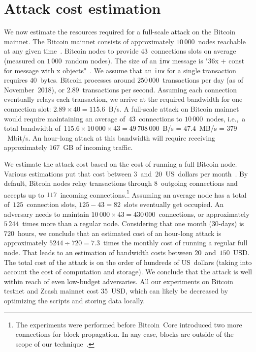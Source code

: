 \section{Attack cost estimation}

We now estimate the resources required for a full-scale attack on the Bitcoin mainnet.
The Bitcoin mainnet consists of approximately $10\,000$~nodes reachable at any given time~\cite{Bitnodes}.
Bitcoin nodes to provide $43$~connections slots on average (measured on $1\,000$~random nodes).
The size of an \texttt{inv} message is "36x + const for message with x objects"~\cite{BitcoinWiki}.
We assume that an \texttt{inv} for a single transaction requires $40$~bytes.
Bitcoin processes around $250\,000$~transactions per day (as of November~2018), or $2.89$~transactions per second.
Assuming each connection eventually relays each transaction, we arrive at the required bandwidth for one connection slot: $2.89 \times 40 = 115.6$~B/s.
A full-scale attack on Bitcoin mainnet would require maintaining an average of~$43$~connections to $10\,000$~nodes, i.e.,~a total bandwidth of~$115.6 \times 10\,000 \times 43 = 49\,708\,000$~B/s = $47.4$~MB/s = $379$~Mbit/s.
An hour-long attack at this bandwidth will require receiving approximately $167$~GB of incoming traffic.

We estimate the attack cost based on the cost of running a full Bitcoin node.
Various estimations put that cost between $3$~and~$20$~US~dollars per month~\cite{Zeyde2018, Connell2017}.
By default, Bitcoin nodes relay transactions through $8$~outgoing connections and accepts up to $117$~incoming connections.\footnote{The experiments were performed before Bitcoin~Core introduced two more connections for block propagation. In any case, blocks are outside of the scope of our technique~\cite{Daftuar2019}.}
Assuming an average node has a total of~$125$~connection slots, $125 - 43 = 82$~slots eventually get occupied.
An adversary needs to maintain $10\,000 \times 43 = 430\,000$~connections, or approximately $5\,244$~times more than a regular node.
Considering that one month ($30$-days) is $720$~hours, we conclude that an estimated cost of an hour-long attack is approximately $5244 \div 720 = 7.3$~times the monthly cost of running a regular full node.
That leads to an estimation of bandwidth costs between $20$~and~$150$~USD\@.
The total cost of the attack is on the order of hundreds of US~dollars (taking into account the cost of computation and storage).
We conclude that the attack is well within reach of even low-budget adversaries.
All our experiments on Bitcoin testnet and Zcash mainnet cost $35$~USD, which can likely be decreased by optimizing the scripts and storing data locally.


